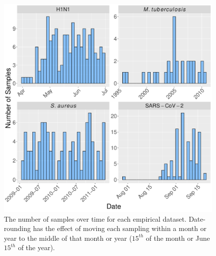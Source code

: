 \documentclass[12pt]{article}
\begin{document}
\begin{figure}[H]
    \centering
    \includegraphics[width=\textwidth]{figures/empirical_sampling_times.pdf}
    \caption{The number of samples over time for each empirical dataset. Date-rounding has the effect of moving each sampling within a month or year to the middle of that month or year ($15^{th}$ of the month or June $15^{th}$ of the year).}
    \label{fig:sampling}
\end{figure}
\end{document}
